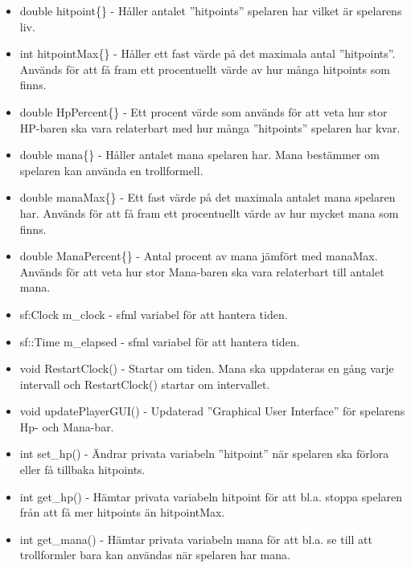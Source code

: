 \documentclass[12pt]{TDP005mall}
\begin{document}
\begin{itemize}
    \item double hitpoint\{\} - Håller antalet ''hitpoints'' spelaren har vilket är spelarens liv.
    \item int hitpointMax\{\} - Håller ett fast värde på det maximala antal ''hitpoints''. Används för att få fram ett procentuellt värde av hur många hitpoints som finns.
    
    \item double HpPercent\{\} - Ett procent värde som används för att veta hur stor HP-baren ska vara relaterbart med hur många ''hitpoints'' spelaren har kvar.
    
    \item double mana\{\} - Håller antalet mana spelaren har. Mana bestämmer om spelaren kan använda en trollformell.
    
    \item double manaMax\{\} - Ett fast värde på det maximala antalet mana spelaren har. Används för att få fram ett procentuellt värde av hur mycket mana som finns.
    
    \item double ManaPercent\{\} - Antal procent av mana jämfört med manaMax. Används för att veta hur stor Mana-baren ska vara relaterbart till antalet mana.
    
    \item sf:Clock m\_clock - sfml variabel för att hantera tiden.
    
    \item sf::Time m\_elapsed - sfml variabel för att hantera tiden.
    
    \item void RestartClock() - Startar om tiden. Mana ska uppdateras en gång varje intervall och RestartClock() startar om intervallet.
    
    \item void updatePlayerGUI() - Updaterad ''Graphical User Interface'' för spelarens Hp- och Mana-bar.
    
    \item int set\_hp() - Ändrar privata variabeln ''hitpoint'' när spelaren ska förlora eller få tillbaka hitpoints.
    
    \item int get\_hp() - Hämtar privata variabeln hitpoint för att bl.a. stoppa spelaren från att få mer hitpoints än hitpointMax.
    
    \item int get\_mana() - Hämtar privata variabeln mana för att bl.a. se till att trollformler bara kan användas när spelaren har mana.
    

\end{itemize}
\end{document}
